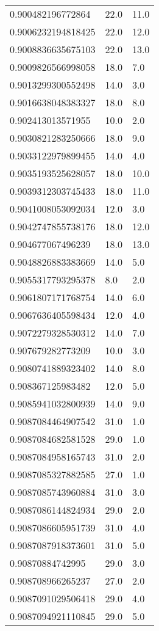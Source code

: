 \begin{center}
\begin{supertabular}[H]{p{0.30\textwidth}p{0.05\textwidth}p{0.05\textwidth}}
0.900482196772864 & 22.0 & 11.0 \\ 
0.9006232194818425 & 22.0 & 12.0 \\ 
0.9008836635675103 & 22.0 & 13.0 \\ 
0.9009826566998058 & 18.0 & 7.0 \\ 
0.9013299300552498 & 14.0 & 3.0 \\ 
0.9016638048383327 & 18.0 & 8.0 \\ 
0.902413013571955 & 10.0 & 2.0 \\ 
0.9030821283250666 & 18.0 & 9.0 \\ 
0.9033122979899455 & 14.0 & 4.0 \\ 
0.9035193525628057 & 18.0 & 10.0 \\ 
0.9039312303745433 & 18.0 & 11.0 \\ 
0.9041008053092034 & 12.0 & 3.0 \\ 
0.9042747855738176 & 18.0 & 12.0 \\ 
0.904677067496239 & 18.0 & 13.0 \\ 
0.9048826883383669 & 14.0 & 5.0 \\ 
0.9055317793295378 & 8.0 & 2.0 \\ 
0.9061807171768754 & 14.0 & 6.0 \\ 
0.9067636405598434 & 12.0 & 4.0 \\ 
0.9072279328530312 & 14.0 & 7.0 \\ 
0.907679282773209 & 10.0 & 3.0 \\ 
0.9080741889323402 & 14.0 & 8.0 \\ 
0.908367125983482 & 12.0 & 5.0 \\ 
0.9085941032800939 & 14.0 & 9.0 \\ 
0.9087084464907542 & 31.0 & 1.0 \\ 
0.9087084682581528 & 29.0 & 1.0 \\ 
0.9087084958165743 & 31.0 & 2.0 \\ 
0.9087085327882585 & 27.0 & 1.0 \\ 
0.9087085743960884 & 31.0 & 3.0 \\ 
0.9087086144824934 & 29.0 & 2.0 \\ 
0.9087086605951739 & 31.0 & 4.0 \\ 
0.9087087918373601 & 31.0 & 5.0 \\ 
0.90870884742995 & 29.0 & 3.0 \\ 
0.908708966265237 & 27.0 & 2.0 \\ 
0.9087091029506418 & 29.0 & 4.0 \\ 
0.9087094921110845 & 29.0 & 5.0 \\ 

\end{supertabular}
\end{center}
